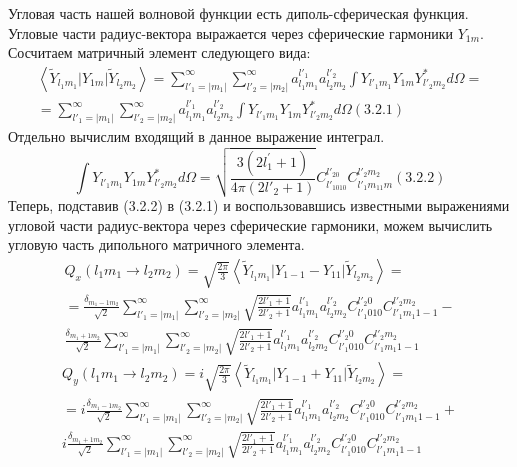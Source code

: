 Угловая часть нашей волновой функции есть диполь-сферическая функция. Угловые части радиус-вектора выражается через сферические гармоники  $Y_{1m}$.
Сосчитаем матричный элемент следующего вида:
\begin{multline*}
\left<\widetilde Y_{l_1 m_1}|Y_{1m}|\widetilde Y_{l_2 m_2} \right> =\sum_{l'_1=|m_1 |}^{\infty}\sum_{l'_2=|m_2|}^{\infty}a_{l_1 m_1}^{l'_1} a_{l_2 m_2}^{l'_2} \int Y_{l'_1 m_1} Y_{1m} Y_{l'_2 m_2}^* d\Omega=
\\
=\sum_{l'_1=|m_1|}^{\infty} \sum_{l'_2=|m_2 |}^{\infty} a_{l_1 m_1}^{l'_1} a_{l_2 m_2}^{l'_2} \int Y_{l'_1 m_1} Y_{1m} Y_{l'_2 m_2}^* d\Omega   (3.2.1)
\end{multline*}
Отдельно вычислим входящий в данное выражение интеграл.
\begin{equation*}
	\int Y_{l'_1m_1}Y_{1m}Y_{l'_2m_2}^{\ast }\mathit{d\Omega }=
	\sqrt{
		\frac{3(2l^{'}_{1}+1)}{4\pi (2l{'}_2 +1)}
	}
	C_{l{'}_{1010}}^{l{'}_{20}}C_{l{'}_1 m_11 m}^{l{'}_2m_2}
	(3.2.2)
\end{equation*}
Теперь, подставив (3.2.2) в (3.2.1) и воспользовавшись известными выражениями угловой части радиус-вектора через сферические гармоники, можем вычислить угловую часть дипольного матричного элемента.
\begin{multline*}
Q_x\left(l_1m_1\rightarrow l_2m_2\right)=\sqrt{\frac{2\pi } 3} \left< \widetilde Y_{l_1m_1}|Y_{1-1}-Y_{11}|\widetilde Y_{l_2m_2} \right> =
\\
= \frac{\delta_{m_1-1 m_2}}{\sqrt{2}}\sum_{l'_1=|m_1|}^{\infty} \sum_{l'_2=|m_2|}^{\infty}\sqrt{\frac{2l'_1+1}{2l'_2+1}}a_{l_1 m_1}^{l'_1 } a_{l_2 m_2}^{l'_2} C_{l'_1 010}^{l'_2 0} C_{l'_1 m_1 1-1}^{l'_2 m_2 }-
\\
\frac{\delta_{m_1+1 m_2}}{\sqrt{2}}\sum_{l'_1=|m_1|}^{\infty} \sum_{l'_2=|m_2|}^{\infty}\sqrt{\frac{2l'_1+1}{2l'_2+1}}a_{l_1 m_1}^{l'_1 } a_{l_2 m_2}^{l'_2} C_{l'_1 010}^{l'_2 0} C_{l'_1 m_1 1-1}^{l'_2 m_2 }
\end{multline*}
\begin{multline*}
Q_y\left(l_1m_1\rightarrow l_2m_2\right)=i\sqrt{\frac{2\pi } 3} \left< \widetilde Y_{l_1m_1}|Y_{1-1}+Y_{11}|\widetilde Y_{l_2m_2} \right> =
\\
= i\frac{\delta_{m_1-1 m_2}}{\sqrt{2}}\sum_{l'_1=|m_1|}^{\infty} \sum_{l'_2=|m_2|}^{\infty}\sqrt{\frac{2l'_1+1}{2l'_2+1}}a_{l_1 m_1}^{l'_1 } a_{l_2 m_2}^{l'_2} C_{l'_1 010}^{l'_2 0} C_{l'_1 m_1 1-1}^{l'_2 m_2 }+
\\
i\frac{\delta_{m_1+1 m_2}}{\sqrt{2}}\sum_{l'_1=|m_1|}^{\infty} \sum_{l'_2=|m_2|}^{\infty}\sqrt{\frac{2l'_1+1}{2l'_2+1}}a_{l_1 m_1}^{l'_1 } a_{l_2 m_2}^{l'_2} C_{l'_1 010}^{l'_2 0} C_{l'_1 m_1 1-1}^{l'_2 m_2 }
\end{multline*}
